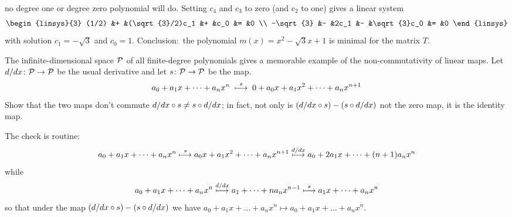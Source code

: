 \begin{exercises}
\begin{answer}
\begin{exparts}
           no degree one or degree zero polynomial will do.
           Setting \( c_4 \) and \( c_3 \) to zero (and $c_2$ to one)
           gives a linear system 
           \begin{equation*}
             \begin{linsys}{3}
               (1/2)     &+  &(\sqrt{3}/2)c_1  &+  &c_0          &=  &0 \\
               -\sqrt{3} &-  &2c_1             &-  &\sqrt{3}c_0  &=  &0
             \end{linsys}
           \end{equation*}
           with solution $c_1=-\sqrt{3}$ and $c_0=1$.
           Conclusion:~the polynomial 
           $m(x)=x^2-\sqrt{3}x+1$
           is minimal for the matrix $T$.
      \end{exparts}  
    \end{answer}
  \item 
    The infinite-dimensional space $\mathcal{P}$ 
    of all finite-degree polynomials
    gives a memorable example of the non-commutativity of
    linear maps.
    Let \( \mbox{$d/dx\colon \mathcal{P}\to \mathcal{P}$} \) be the usual derivative
    and let \( \mbox{$s\colon \mathcal{P}\to \mathcal{P}$} \) be the  map.
    \begin{equation*}
      a_0+a_1x+\dots+a_nx^n
      \;\stackrel{s}{\longmapsto}\;
      0+a_0x+a_1x^2+\dots+a_nx^{n+1}
    \end{equation*}
    Show that the two maps don't commute
    \( d/dx\mathbin{\circ} s\neq s\mathbin{\circ} d/dx \); in fact, 
    not only is \( (d/dx\mathbin{\circ} s)-(s\mathbin{\circ} d/dx) \) not
    the zero map, it is the identity map.
    \begin{answer}
      The check is routine:
      \begin{equation*}
        a_0+a_1x+\dots+a_nx^n\stackrel{s}{\longmapsto}a_0x+a_1x^2+\dots+a_nx^{n+1}
                  \stackrel{d/dx}{\longmapsto} a_0+2a_1x+\dots+(n+1)a_nx^n
      \end{equation*}
      while
      \begin{equation*}
        a_0+a_1x+\dots+a_nx^n
                  \stackrel{d/dx}{\longmapsto} a_1+\dots+na_nx^{n-1}
                  \stackrel{s}{\longmapsto}a_1x+\dots+a_nx^n
      \end{equation*}
      so that under the map $(d/dx\mathbin{\circ} s)-(s\mathbin{\circ} d/dx)$ 
      we have 
        $a_0+a_1x+\dots+a_nx^n
                  \mapsto
                  a_0+a_1x+\dots+a_nx^n$.
    \end{answer}
  \item 

\end{exercises}

